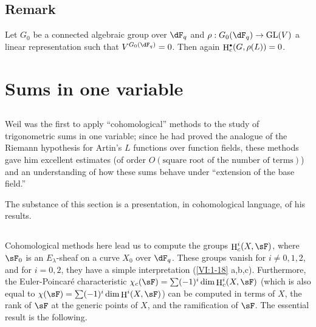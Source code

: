 \documentclass[oneside]{book}
\DeclareMathOperator{\h}{H}
\newcounter{char}
\theoremstyle{sga-source}
\theoremstyle{sga-source-dash}
\theoremstyle{sga-source-dotdash}
\theoremstyle{sga-source-number-note-dash}
\theoremstyle{sga-source-note-number-dotdash}
\theoremstyle{sga-source-example-dotdash}
\theoremstyle{sga-source-inline-number}
\theoremstyle{sga-source-bare-number}
\theoremstyle{sga-source}
\let\oldbullet\bullet
\renewcommand{\bullet}{\textnormal{\tiny$\oldbullet$}}
\newcommand{\PrintPage}[1]{}\newcommand{\MathPage}[1]{}\newcommand{\PrintCite}[2]{#1}\newcommand{\var}[3]{#2}
\begin{document}
\subsection{Remark}\label{VI:2-9}

Let $G_0$ be a connected algebraic group over $\dF_q$ and 
$\rho:G_0(\dF_q) \to \operatorname{GL}(V)$ a linear representation 
such that $V^{G_0(\dF_q)}=0$. Then again $\h_c^\bullet(G,\rho(L))=0$. 










\PrintPage{189}
\section{Sums in one variable}\label{VI:3}





\subsection{}\label{VI:3-1}

Weil was the first to apply ``cohomological'' methods to 
the study of trigonometric sums in one variable; since he had 
proved the analogue of the Riemann hypothesis for Artin's $L$ functions 
over function fields, these methods gave him excellent 
estimates (of order $O(\text{square root of the number of terms})$) and an 
understanding of how these sums behave under ``extension of the base field.'' 

The substance of this section is a presentation, in cohomological language, of 
his results. 





\subsection{}\label{VI:3-2}

Cohomological methods here lead us to compute the groups 
$\h_c^i(X,\sF)$, where $\sF_0$ is an $E_\lambda$-sheaf on a curve $X_0$ over 
$\dF_q$. These groups vanish for $i\ne 0,1,2$, and for 
$i=0,2$, they have a simple interpretation (\ref{VI:1-18} a,b,c). Furthermore, the 
Euler-Poincaré characteristic 
$\chi_c(\sF) = \sum (-1)^i \dim \h_c^i(X,\sF)$ (which is also equal to 
$\chi(\sF) = \sum (-1)^i \dim \h^i(X,\sF)$) can be computed in terms of 
$X$, the rank of $\sF$ at the generic points of $X$, and the 
ramification of $\sF$. The essential result is the following. 
\end{document}
